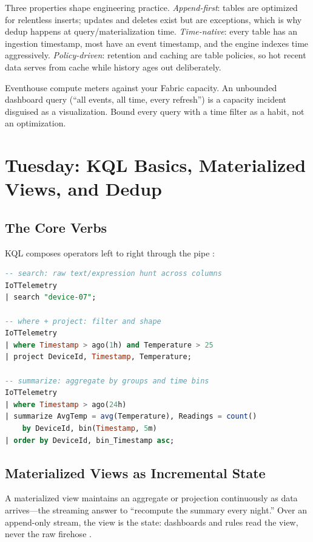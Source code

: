 Three properties shape engineering practice. \emph{Append-first}: tables are optimized for relentless inserts; updates and deletes exist but are exceptions, which is why dedup happens at query/materialization time. \emph{Time-native}: every table has an ingestion timestamp, most have an event timestamp, and the engine indexes time aggressively. \emph{Policy-driven}: retention and caching are table policies, so hot recent data serves from cache while history ages out deliberately.

\begin{pitfall}
Eventhouse compute meters against your Fabric capacity. An unbounded dashboard query (``all events, all time, every refresh'') is a capacity incident disguised as a visualization. Bound every query with a time filter as a habit, not an optimization.
\end{pitfall}

\section{Tuesday: KQL Basics, Materialized Views, and Dedup}
\subsection{The Core Verbs}
KQL composes operators left to right through the pipe \cite{microsoftKQL}:

\begin{lstlisting}[language=SQL,caption={Core KQL verbs over the IoT stream.},label={lst:chapter14-core}]
-- search: raw text/expression hunt across columns
IoTTelemetry
| search "device-07";

-- where + project: filter and shape
IoTTelemetry
| where Timestamp > ago(1h) and Temperature > 25
| project DeviceId, Timestamp, Temperature;

-- summarize: aggregate by groups and time bins
IoTTelemetry
| where Timestamp > ago(24h)
| summarize AvgTemp = avg(Temperature), Readings = count()
    by DeviceId, bin(Timestamp, 5m)
| order by DeviceId, bin_Timestamp asc;
\end{lstlisting}

\subsection{Materialized Views as Incremental State}
A materialized view maintains an aggregate or projection continuously as data arrives---the streaming answer to ``recompute the summary every night.'' Over an append-only stream, the view is the state: dashboards and rules read the view, never the raw firehose \cite{microsoftKQLMV}.

